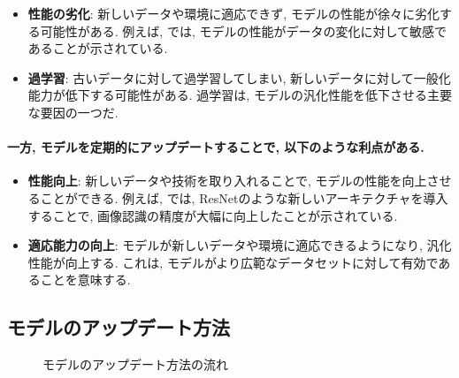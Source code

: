 \documentclass[a4paper, 12pt]{report}
\begin{document}
\begin{itemize}
    \item \textbf{性能の劣化}: 新しいデータや環境に適応できず, モデルの性能が徐々に劣化する可能性がある. 例えば, \cite{goodfellow2016deep}では, モデルの性能がデータの変化に対して敏感であることが示されている. 
    \item \textbf{過学習}: 古いデータに対して過学習してしまい, 新しいデータに対して一般化能力が低下する可能性がある. 過学習は, モデルの汎化性能を低下させる主要な要因の一つだ\cite{bishop2006pattern}. 
\end{itemize}

\paragraph{一方, モデルを定期的にアップデートすることで, 以下のような利点がある. }


\begin{itemize}
    \item \textbf{性能向上}: 新しいデータや技術を取り入れることで, モデルの性能を向上させることができる. 例えば, \cite{he2016deep}では, ResNetのような新しいアーキテクチャを導入することで, 画像認識の精度が大幅に向上したことが示されている. 
    \item \textbf{適応能力の向上}: モデルが新しいデータや環境に適応できるようになり, 汎化性能が向上する. これは, モデルがより広範なデータセットに対して有効であることを意味する\cite{lecun2015deep}. 
\end{itemize}

\subsection{モデルのアップデート方法}

\begin{figure}[H]
    \centering
    \caption{モデルのアップデート方法の流れ}
    \label{fig:model_update_flow}
\end{figure}
\end{document}
